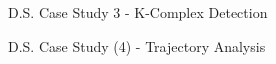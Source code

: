 \documentclass[
 size=14pt,
 paper=smartboard,  %
 mode=present, 		%
 display=slides, 	%
 style=tuliplab,  	%
 pauseslide,
 fleqn,leqno]{powerdot}
\begin{document}
\begin{slide}[toc=,bm=]{D.S. Case Study 3 - K-Complex Detection}


\end{slide}


\begin{slide}[toc=,bm=]{D.S. Case Study (4) - Trajectory Analysis}


\end{slide}
\end{document}
